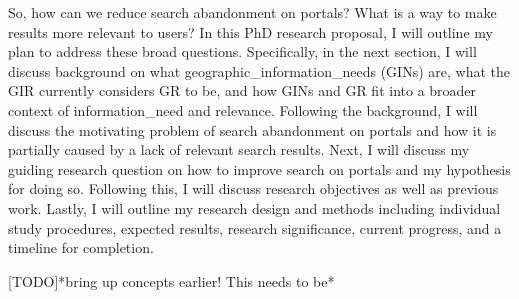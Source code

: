 So, how can we reduce search abandonment on portals? What is a way to make results more relevant to users? In this PhD research proposal, I will outline my plan to address these broad questions. Specifically, in the next section, I will discuss background on what \gls{geographic_information_needs} (\acrshort{GIN}s) are, what the GIR currently considers GR to be, and how GINs and GR fit into a broader context of \gls{information_need} and relevance. Following the background, I will discuss the motivating problem of search abandonment on portals and how it is partially caused by a lack of relevant search results. Next, I will discuss my guiding research question on how to improve search on portals and my hypothesis for doing so. Following this, I will discuss research objectives as well as previous work. Lastly, I will outline my research design and methods including individual study procedures, expected results, research significance, current progress, and a timeline for completion.

[TODO]*bring up concepts earlier! This needs to be*
